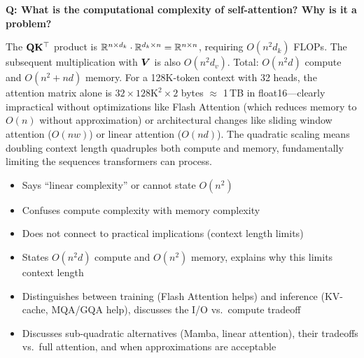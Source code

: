 \bigskip

\begin{interviewq}
\textbf{Q: What is the computational complexity of self-attention? Why is it a problem?}

 \quad {} \quad \badgefreq{\freqhigh}

\stronganswer
The $\mathbf{Q}\mathbf{K}^\top$ product is $\mathbb{R}^{n \times d_k} \cdot \mathbb{R}^{d_k \times n} = \mathbb{R}^{n \times n}$,
requiring $O(n^2 d_k)$ FLOPs.  The subsequent multiplication with $\bm{V}$ is also
$O(n^2 d_v)$.  Total: $O(n^2 d)$ compute and $O(n^2 + nd)$ memory.  For a
128K-token context with 32 heads, the attention matrix alone is
$32 \times 128\text{K}^2 \times 2$ bytes $\approx$ 1\,TB in float16---clearly
impractical without optimizations like Flash Attention (which reduces memory to
$O(n)$ without approximation) or architectural changes like sliding window
attention ($O(nw)$) or linear attention ($O(nd)$).  The quadratic scaling means
doubling context length quadruples both compute and memory, fundamentally
limiting the sequences transformers can process.

\redflags
\begin{itemize}
    \item Says ``linear complexity'' or cannot state $O(n^2)$
    \item Confuses compute complexity with memory complexity
    \item Does not connect to practical implications (context length limits)
\end{itemize}


\goodgreat
\begin{itemize}
    \item {} States $O(n^2 d)$ compute and $O(n^2)$ memory, explains
          why this limits context length
    \item {} Distinguishes between training (Flash Attention helps) and
          inference (KV-cache, MQA/GQA help), discusses the I/O vs.\ compute tradeoff
    \item {} Discusses sub-quadratic alternatives (Mamba, linear attention),
          their tradeoffs vs.\ full attention, and when approximations are acceptable
\end{itemize}

\end{interviewq}

